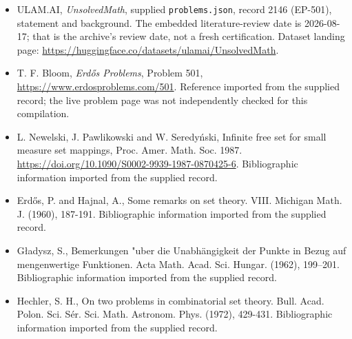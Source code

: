 \documentclass[11pt,a4paper]{article}
\begin{document}
{\small

\begin{itemize}

\item[\hypertarget{source:2146:1}{S1}] ULAM.AI, \emph{UnsolvedMath}, supplied \texttt{problems.json}, record 2146 (EP-501), statement and background. The embedded literature-review date is 2026-08-17; that is the archive’s review date, not a fresh certification. Dataset landing page: \url{https://huggingface.co/datasets/ulamai/UnsolvedMath}.

\item[\hypertarget{source:2146:2}{S2}] T. F. Bloom, \emph{Erdős Problems}, Problem 501, \url{https://www.erdosproblems.com/501}. Reference imported from the supplied record; the live problem page was not independently checked for this compilation.

\item[\hypertarget{source:2146:3}{S3}] L. Newelski, J. Pawlikowski and W. Seredyński, Infinite free set for small measure set mappings, Proc. Amer. Math. Soc. 1987. \url{https://doi.org/10.1090/S0002-9939-1987-0870425-6}. Bibliographic information imported from the supplied record.

\item[\hypertarget{source:2146:4}{S4}] Erd\H{o}s, P. and Hajnal, A., Some remarks on set theory. VIII. Michigan Math. J. (1960), 187-191. Bibliographic information imported from the supplied record.

\item[\hypertarget{source:2146:5}{S5}] G\l adysz, S., Bemerkungen "uber die {U}nabh\"{a}ngigkeit der {P}unkte in {B}ezug auf mengenwertige {F}unktionen. Acta Math. Acad. Sci. Hungar. (1962), 199--201. Bibliographic information imported from the supplied record.

\item[\hypertarget{source:2146:6}{S6}] Hechler, S. H., On two problems in combinatorial set theory. Bull. Acad. Polon. Sci. S\'{e}r. Sci. Math. Astronom. Phys. (1972), 429-431. Bibliographic information imported from the supplied record.

\end{itemize}

}

\label{end:2146}
\end{document}
